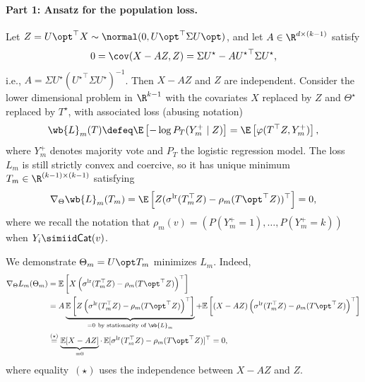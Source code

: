\documentclass[11pt]{article}
\newcommand{\Ep}{\mathbb{E}}
\newcommand{\prn}[1]{\left({#1}\right)} %
\newcommand{\brk}[1]{\left[{#1}\right]} %
\newcommand{\cat}{\mathsf{Cat}}  %
\newcommand{\lr}{^{\textup{lr}}}  %
\newcommand{\sloss}{\varphi}  %
\begin{document}
\paragraph{Part 1: Ansatz for the population loss.}
Let $Z = {U\opt}^\top X \sim \normal(0, {U\opt}^\top \Sigma U\opt)$, and let
$A \in \R^{d \times (k-1)}$ satisfy
\begin{align*}
  0 = \cov(X - AZ, Z) = \Sigma U^\star  - A {U^\star}^\top \Sigma U^\star,
\end{align*}
i.e., $A = \Sigma U^\star ({U^\star}^\top \Sigma U^\star)^{-1}$.
%
Then $X-AZ$ and $Z$ are independent. Consider the lower dimensional problem
in $\R^{k-1}$ with the covariates $X$ replaced by $Z$ and $\Theta^\star$
replaced by $T^\star$,
with associated loss (abusing notation)
\begin{equation*}
  \wb{L}_m(T) \defeq \E\left[-\log P_T(Y_m^+ \mid Z)\right]
  = \E\left[\sloss(T^\top Z, Y_m^+)\right],
\end{equation*}
where $Y_m^+$ denotes majority vote and $P_T$ the logistic regression model.
%
The loss $L_m$ is still strictly  convex and coercive, so
it has unique minimum $T_m \in \R^{(k-1) \times (k-1)}$ satisfying
\begin{align*}
  \nabla_{\Theta} \wb{L}_m(T_m)
  = \E\left[Z (\sigma\lr(T_m^\top Z) - \rho_m({T\opt}^\top Z))^\top\right]
  = 0,
\end{align*}
where we recall the notation that
$\rho_m(v) = (P(Y_m^+ = 1), \ldots, P(Y_m^+ = k))$
when $Y_i \simiid \cat(v)$.

We demonstrate $\Theta_m = U\opt T_m$ minimizes $L_m$.
%
Indeed,
\begin{align*}
  \nabla_{\Theta} L_m(\Theta_m)
  & = \Ep \brk{X \prn{ \sigma\lr(T_m^\top Z) - \rho_m({T\opt}^\top Z)}^\top} \\
  & = A \underbrace{\Ep \brk{Z \prn{ \sigma\lr(T_m^\top Z)
        - \rho_m({T\opt}^\top Z)}^\top}}_{
    = 0~\text{by stationarity of }\wb{L}_m}
  + \Ep \brk{(X-AZ) \prn{ \sigma\lr(T_m^\top Z) - \rho_m({T\opt}^\top Z)}^\top} \\
  & \stackrel{(\star)}{=}
  \underbrace{\Ep [X-AZ]}_{=0} \cdot \,
  \Ep[\sigma\lr(T_m^\top Z) - \rho_m({T\opt}^\top Z)]^\top = 0,
\end{align*}
where equality~$(\star)$ uses the independence between $X-AZ$ and $Z$.
\end{document}
